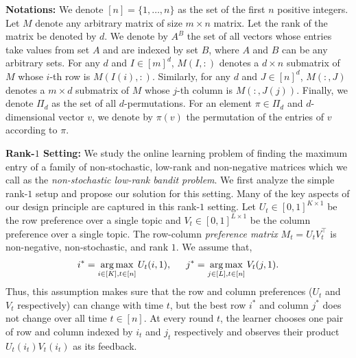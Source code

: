 
\newcommand{\transpose}{^\mathsf{\scriptscriptstyle T}}
\textbf{Notations:} We denote $[n] = \{1, \dots, n\}$ as the set of the first $n$ positive integers. Let $M$ denote any arbitrary matrix of size $m \times n$ matrix. Let the rank of the matrix be denoted by $d$. We denote by $A^B$ the set of all vectors whose entries take values from set $A$ and are indexed by set $B$, where $A$ and $B$ can be any arbitrary sets. For any $d$ and $I \in [m]^d$, $M(I, :)$ denotes a $d \times n$ submatrix of $M$ whose $i$-th row is $M(I(i), :)$. Similarly, for any $d$ and $J \in [n]^d$, $M(:, J)$ denotes a $m \times d$ submatrix of $M$ whose $j$-th column is $M(:, J(j))$. Finally, we denote $\Pi_d$ as the set of all $d$-permutations. For an element $\pi \in \Pi_d$ and $d$-dimensional vector $v$, we denote by $\pi(v)$ the permutation of the entries of $v$ according to $\pi$.

\textbf{Rank-$1$ Setting:} We study the online learning problem of finding the maximum entry of a family of non-stochastic, low-rank and non-negative matrices  which we call as the \emph{non-stochastic low-rank bandit problem}. We first analyze the simple rank-$1$ setup and propose our solution for this setting. Many of the key aspects of our design principle are captured in this rank-$1$ setting. Let $U_t\in [0,1]^{K\times 1}$ be the row preference over a single topic and $V_t \in [0,1]^{L\times 1}$ be the column preference over a single topic. The row-column \emph{preference matrix} $M_t = U_tV_t^{\intercal}$ is non-negative, non-stochastic, and rank $1$. We assume that,
\begin{align}
i^\ast = \mathop{\rm arg\,max}_{i\in[K], t\in[n]}U_t(i,1), \hspace{1.5em}
j^\ast = \mathop{\rm arg\,max}_{j\in[L], t\in[n]}V_t(j,1) \label{eq:rank1ij}.
\end{align}
Thus, this assumption makes sure that the row and column preferences ($U_t$ and $V_t$ respectively) can change with time $t$, but the best row $i^*$ and column $j^*$ does not change over all time $t\in[n]$. At every round $t$, the learner chooses one pair of row and column indexed by $i_t$ and $j_t$ respectively and observes their product $U_t(i_t)V_t(i_t)$ as its feedback.

